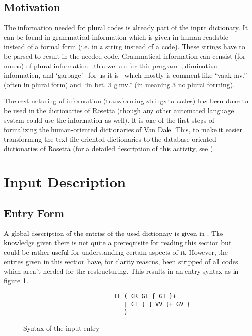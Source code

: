 \subsection{Motivation}

The information needed for plural codes is already part of the input 
dictionary. It can be found in grammatical information which is given in
human-readable instead of a formal form (i.e. in a string instead of a 
code). These strings have to be parsed to result in the needed code. Grammatical
information can consist (for nouns) of plural information --this we use for 
this program--, diminutive information, and `garbage' --for us it is-- which 
mostly is comment like ``vaak mv.'' (often in plural form) and ``in bet. 3 
g.mv.'' (in meaning 3 no plural forming).

The restructuring of information (transforming strings to codes) has been done 
to be 
used in the dictionaries of Rosetta (though any other automated language system
could use the information as well). It is one of the first steps of formalizing 
the human-oriented dictionaries of Van Dale. This, to make it easier 
transforming the text-file-oriented dictionaries to the database-oriented 
dictionaries of Rosetta (for a detailed description of this activity, see
\cite{MSM:use}).

\newpage
\section{Input Description}

\subsection{Entry Form}

A global description of the entries of the used dictionary is given in 
\cite{SME:descr}. The knowledge given there is not quite a prerequisite for 
reading this section but could be rather useful for understanding certain 
aspects of it. However, the entries given in this section have, for clarity 
reasons, been stripped of all codes which aren't needed for the restructuring. 
This results in an entry syntax as in figure 1.

\begin{figure}[ht]
 \begin{center}
  \begin{verbatim}
                          II ( GR GI { GI }+
                             | GI { { VV }+ GV }
                             )
  \end{verbatim}
  \caption{Syntax of the input entry}
 \end{center}
\end{figure}

